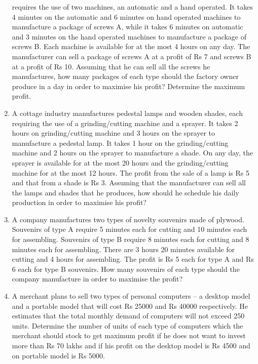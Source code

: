 \begin{enumerate}[label=\arabic*.,ref=\thesection.\theenumi]
requires the use of two machines, an automatic and a hand operated. It takes
4 minutes on the automatic and 6 minutes on hand operated machines to
manufacture a package of screws A, while it takes 6 minutes on automatic and
3 minutes on the hand operated machines to manufacture a package of screws
B. Each machine is available for at the most 4 hours on any day. The manufacturer
can sell a package of screws A at a profit of Rs 7 and screws B at a profit of
Rs 10. Assuming that he can sell all the screws he manufactures, how many
packages of each type should the factory owner produce in a day in order to
maximise his profit? Determine the maximum profit.\\
\item A cottage industry manufactures pedestal lamps and wooden shades, each
requiring the use of a grinding/cutting machine and a sprayer. It takes 2 hours on
grinding/cutting machine and 3 hours on the sprayer to manufacture a pedestal
lamp. It takes 1 hour on the grinding/cutting machine and 2 hours on the sprayer
to manufacture a shade. On any day, the sprayer is available for at the most 20
hours and the grinding/cutting machine for at the most 12 hours. The profit from
the sale of a lamp is Rs 5 and that from a shade is Rs 3. Assuming that the
manufacturer can sell all the lamps and shades that he produces, how should he
schedule his daily production in order to maximise his profit?\\
\item A company manufactures two types of novelty souvenirs made of plywood.
Souvenirs of type A require 5 minutes each for cutting and 10 minutes each for
assembling. Souvenirs of type B require 8 minutes each for cutting and 8 minutes
each for assembling. There are 3 hours 20 minutes available for cutting and 4
hours for assembling. The profit is Rs 5 each for type A and Rs 6 each for type
B souvenirs. How many souvenirs of each type should the company manufacture
in order to maximise the profit?\\
\item A merchant plans to sell two types of personal computers – a desktop model and
a portable model that will cost Rs 25000 and Rs 40000 respectively. He estimates
that the total monthly demand of computers will not exceed 250 units. Determine
the number of units of each type of computers which the merchant should stock
to get maximum profit if he does not want to invest more than Rs 70 lakhs and if
his profit on the desktop model is Rs 4500 and on portable model is Rs 5000.\\

\end{enumerate}
